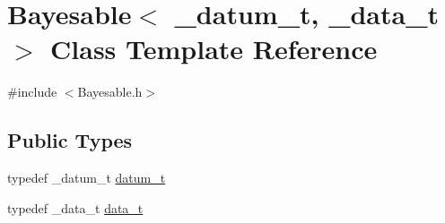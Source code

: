 \hypertarget{class_bayesable}{}\section{Bayesable$<$ \+\_\+datum\+\_\+t, \+\_\+data\+\_\+t $>$ Class Template Reference}
\label{class_bayesable}


{\ttfamily \#include $<$Bayesable.\+h$>$}

\subsection*{Public Types}
\begin{DoxyCompactItemize}
\item 
typedef \+\_\+datum\+\_\+t \hyperlink{class_bayesable_a9f1a6c0cd7855550fa10b1a8f13a5867}{datum\+\_\+t}
\item 
typedef \+\_\+data\+\_\+t \hyperlink{class_bayesable_aa2788c4d7718c0a824e1d28c4c98f921}{data\+\_\+t}
\end{DoxyCompactItemize}
